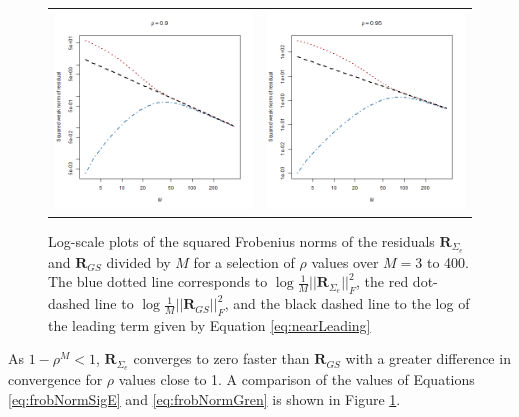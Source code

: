 \documentclass[letterpaper,12pt,oneside,final]{article}
\newcommand{\m}[1]{\mathbf{#1}}               %
\newcommand{\norm}[1]{||{#1}||}              %
\newcommand{\frob}[1]{\norm{#1}_F}
\begin{document}
\begin{figure}
\begin{tabular}{cc}
    \includegraphics[scale = 0.45]{rho90.png} & \includegraphics[scale = 0.45]{rho95.png}
  \end{tabular}
  \caption{Log-scale plots of the squared Frobenius norms of the residuals $\m{R}_{\Sigma_e}$ and $\m{R}_{GS}$ divided by $M$ for a selection of $\rho$ values over $M = 3$ to 400. The blue dotted line corresponds to $\log \frac{1}{M} \frob{\m{R}_{\Sigma_e}}^2$, the red dot-dashed line to  $\log \frac{1}{M} \frob{\m{R}_{GS}}^2$, and the black dashed line to the log of the leading term given by Equation \ref{eq:nearLeading}} \label{fig:rhoPlots}
\end{figure}
As $1 - \rho^M < 1$, $\m{R}_{\Sigma_e}$ converges to zero faster than $\m{R}_{GS}$ with a greater difference in convergence for $\rho$ values close to 1. A comparison of the values of Equations \ref{eq:frobNormSigE} and \ref{eq:frobNormGren} is shown in Figure \ref{fig:rhoPlots}.
\end{document}
